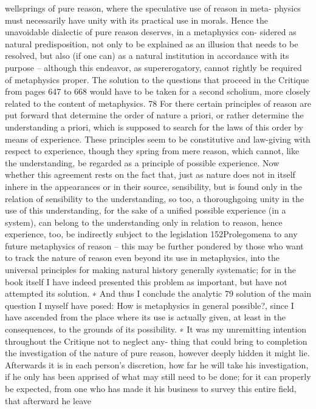 wellsprings of pure reason, where the speculative use of reason in meta-
physics must necessarily have unity with its practical use in morals. Hence
the unavoidable dialectic of pure reason deserves, in a metaphysics con-
sidered as natural predisposition, not only to be explained as an illusion
that needs to be resolved, but also (if one can) as a natural institution in
accordance with its purpose – although this endeavor, as supererogatory,
cannot rightly be required of metaphysics proper.
The solution to the questions that proceed in the Critique from pages
647 to 668 would have to be taken for a second scholium, more closely
related to the content of metaphysics. 78 For there certain principles of
reason are put forward that determine the order of nature a priori, or
rather determine the understanding a priori, which is supposed to search
for the laws of this order by means of experience. These principles seem
to be constitutive and law-giving with respect to experience, though
they spring from mere reason, which cannot, like the understanding,
be regarded as a principle of possible experience. Now whether this
agreement rests on the fact that, just as nature does not in itself inhere
in the appearances or in their source, sensibility, but is found only in
the relation of sensibility to the understanding, so too, a thoroughgoing
unity in the use of this understanding, for the sake of a uniﬁed possible
experience (in a system), can belong to the understanding only in relation
to reason, hence experience, too, be indirectly subject to the legislation
152Prolegomena to any future metaphysics
of reason – this may be further pondered by those who want to track the
nature of reason even beyond its use in metaphysics, into the universal
principles for making natural history generally systematic; for in the
book itself I have indeed presented this problem as important, but have
not attempted its solution. ∗
And thus I conclude the analytic 79 solution of the main question I
myself have posed: How is metaphysics in general possible?, since I have
ascended from the place where its use is actually given, at least in the
consequences, to the grounds of its possibility.
∗
It was my unremitting intention throughout the Critique not to neglect any-
thing that could bring to completion the investigation of the nature of pure
reason, however deeply hidden it might lie. Afterwards it is in each person’s
discretion, how far he will take his investigation, if he only has been apprised
of what may still need to be done; for it can properly be expected, from one
who has made it his business to survey this entire ﬁeld, that afterward he leave
